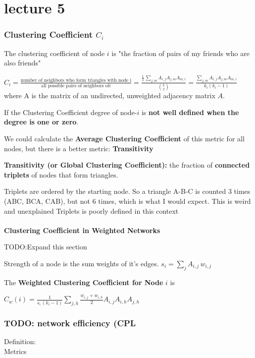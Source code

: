 \documentclass[crop=false]{standalone}
\begin{document}
\section{lecture 5}

\subsubsection{Clustering Coefficient $C_i$}
The clustering coefficient of node $i$ is "the fraction of pairs of my friends who are also friends"

$ C_i =\frac{\text{number of neighbors who form triangles with node i}}{\text{all possible pairs of neighbors of} i}= \frac{\frac{1}{2} \, \sum \limits_{j,m} A_{i,j}A_{j,m}A_{m,i}}{\binom {k} {2}} = \frac{\sum \limits_{j,m} A_{i,j}A_{j,m}A_{m,i}}{k_i (k_i-1)} $ where A is the matrix of an undirected, unweighted adjacency matrix $A$. 

If the Clustering Coefficient degree of node-$i$ is \textbf{not well defined when the degree is one or zero}.

We could calculate the \textbf{Average Clustering Coefficient} of this metric for all nodes, but there is a better metric: \textbf{Transitivity}

\textbf{Transitivity (or Global Clustering Coefficient):} the fraction of \textbf{connected triplets} of nodes that form triangles.

Triplets are ordered by the starting node. So a triangle A-B-C is counted 3 times (ABC, BCA, CAB), but not 6 times, which is what I would expect. This is weird and unexplained
 Triplets is poorly defined in this context
\\
\\
\textbf{Clustering Coefficient in Weighted Networks}

 TODO:Expand this section

Strength of a node is the sum weights of it's edges.
$s_i = \sum_j A_{i,j} \, w_{i,j}$

The \textbf{Weighted Clustering Coefficient for Node} $i$ is

$C_{w}(i) = \frac{1}{s_i \, (k_i-1)} \sum_{j,h} \frac{w_{i,j}+w_{i,h}}{2} A_{i,j}A_{i,h}A_{j,h}$
\subsubsection{ TODO: network efficiency (CPL}
Definition:\\
Metrics\\
\end{document}
